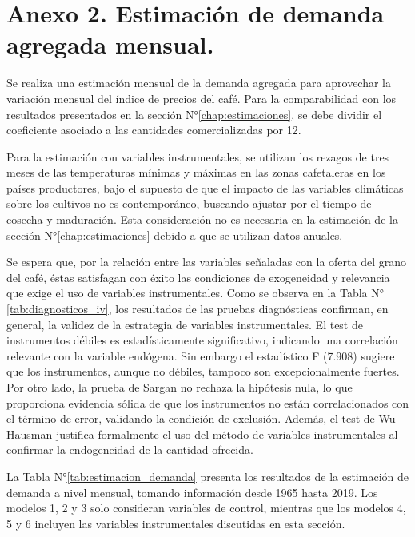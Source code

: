 \chapter{Anexo 2. Estimación de demanda agregada mensual.}
\label{chap:anexo2}

Se realiza una estimación mensual de la demanda agregada para aprovechar la variación mensual del índice de precios del café. Para la comparabilidad con los resultados presentados en la sección N°\ref{chap:estimaciones}, se debe dividir el coeficiente asociado a las cantidades comercializadas por 12.

Para la estimación con variables instrumentales, se utilizan los rezagos de tres meses de las temperaturas mínimas y máximas en las zonas cafetaleras en los países productores, bajo el supuesto de que el impacto de las variables climáticas sobre los cultivos no es contemporáneo, buscando ajustar por el tiempo de cosecha y maduración. Esta consideración no es necesaria en la estimación de la sección N°\ref{chap:estimaciones} debido a que se utilizan datos anuales.

Se espera que, por la relación entre las variables señaladas con la oferta del grano del café, éstas satisfagan con éxito las condiciones de exogeneidad y relevancia que exige el uso de variables instrumentales. Como se observa en la Tabla N°\ref{tab:diagnosticos_iv}, los resultados de las pruebas diagnósticas confirman, en general, la validez de la estrategia de variables instrumentales. El test de instrumentos débiles es estadísticamente significativo, indicando una correlación relevante con la variable endógena. Sin embargo el estadístico F (7.908) sugiere que los instrumentos, aunque no débiles, tampoco son excepcionalmente fuertes. Por otro lado, la prueba de Sargan no rechaza la hipótesis nula, lo que proporciona evidencia sólida de que los instrumentos no están correlacionados con el término de error, validando la condición de exclusión. Además, el test de Wu-Hausman justifica formalmente el uso del método de variables instrumentales al confirmar la endogeneidad de la cantidad ofrecida.

La Tabla N°\ref{tab:estimacion_demanda} presenta los resultados de la estimación de demanda a nivel mensual, tomando información desde 1965 hasta 2019. Los modelos 1, 2 y 3 solo consideran variables de control, mientras que los modelos 4, 5 y 6 incluyen las variables instrumentales discutidas en esta sección.




